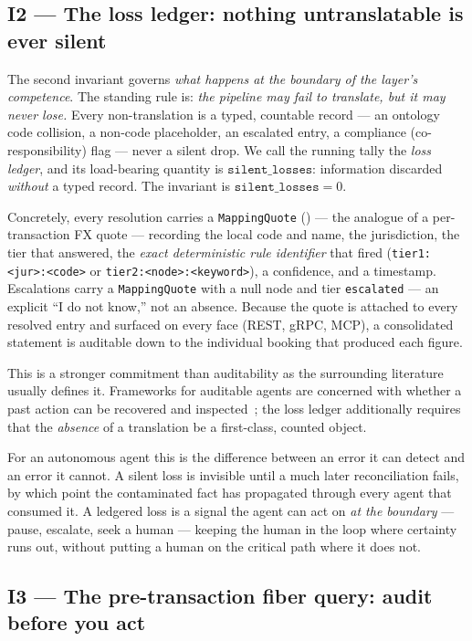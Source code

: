 \documentclass[11pt]{clapps}  %
\begin{document}
\subsection{I2 --- The loss ledger: nothing untranslatable is ever silent}

The second invariant governs \emph{what happens at the boundary of the layer's
competence}. The standing rule is: \emph{the pipeline may fail to translate, but
it may never lose.} Every non-translation is a typed, countable record ---
an ontology code collision, a non-code placeholder, an escalated entry, a
compliance (co-responsibility) flag --- never a silent drop. We call the running
tally the \emph{loss ledger}, and its load-bearing quantity is
$\texttt{silent\_losses}$: information discarded \emph{without} a typed record.
The invariant is $\texttt{silent\_losses} = 0$.

Concretely, every resolution carries a \texttt{MappingQuote}
() --- the analogue of a per-transaction FX
quote --- recording the local code and name, the jurisdiction, the tier that
answered, the \emph{exact deterministic rule identifier} that fired
(\texttt{tier1:<jur>:<code>} or \texttt{tier2:<node>:<keyword>}), a confidence,
and a timestamp. Escalations carry a \texttt{MappingQuote} with a null node and
tier \texttt{escalated} --- an explicit ``I do not know,'' not an absence.
Because the quote is attached to every resolved entry and surfaced on every
face (REST, gRPC, MCP), a consolidated statement is auditable down to the
individual booking that produced each figure.

This is a stronger commitment than auditability as the surrounding literature
usually defines it. Frameworks for auditable agents are concerned with whether a
past action can be recovered and inspected~\cite{nian2026auditableagents,wang2026agenttraces};
the loss ledger additionally requires that the \emph{absence} of a translation
be a first-class, counted object.

For an autonomous agent this is the difference between an error it can detect and
an error it cannot. A silent loss is invisible until a much later reconciliation
fails, by which point the contaminated fact has propagated through every agent
that consumed it. A ledgered loss is a signal the agent can act on \emph{at the
boundary} --- pause, escalate, seek a human --- keeping the human in the loop
where certainty runs out, without putting a human on the critical path where it
does not.

\subsection{I3 --- The pre-transaction fiber query: audit before you act}
\end{document}
